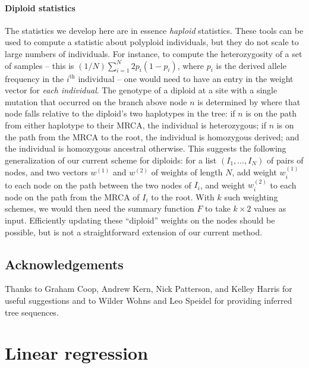 \documentclass{article}
\begin{document}
\paragraph{Diploid statistics}
The statistics we develop here are in essence \emph{haploid} statistics.
These tools can be used to compute a statistic about polyploid individuals,
but they do not scale to large numbers of individuals.
For instance, to compute the heterozygosity of a set of samples
-- this is $(1/N) \sum_{i=1}^N 2 p_i (1-p_i)$, where $p_i$ is the derived allele frequency
in the $i^\text{th}$ individual --
one would need to have an entry in the weight vector for \emph{each individual}.
The genotype of a diploid at a site with a single mutation that occurred on the branch above node $n$
is determined by where that node falls relative to the diploid's two haplotypes in the tree:
if $n$ is on the path from either haplotype to their MRCA, the individual is heterozygous;
if $n$ is on the path from the MRCA to the root, the individual is homozygous derived;
and the individual is homozygous ancestral otherwise.
This suggests the following generalization of our current scheme for diploids:
for a list $(I_1, \ldots, I_N)$ of pairs of nodes,
and two vectors $w^{(1)}$ and $w^{(2)}$ of weights of length $N$,
add weight $w^{(1)}_i$ to each node on the path between the two nodes of $I_i$,
and weight $w^{(2)}_i$ to each node on the path from the MRCA of $I_i$ to the root.
With $k$ such weighting schemes, we would then need the summary function $F$
to take $k \times 2$ values as input.
Efficiently updating these ``diploid'' weights on the nodes should be possible,
but is not a straightforward extension of our current method.




\subsection*{Acknowledgements}
Thanks to Graham Coop, Andrew Kern, Nick Patterson, and Kelley Harris for useful suggestions
and to Wilder Wohns and Leo Speidel for providing inferred tree sequences.




\clearpage
\appendix
\setcounter{table}{0}
\renewcommand{\thetable}{S\arabic{table}}
\setcounter{figure}{0}
\renewcommand{\thefigure}{S\arabic{figure}}




\appendix

\section{Linear regression}
\end{document}
